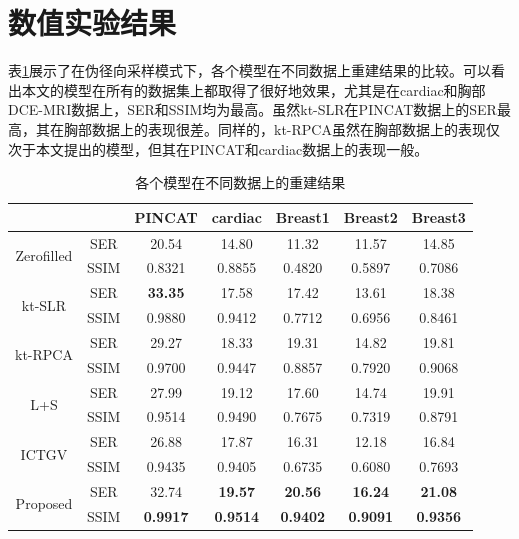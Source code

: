 \section{数值实验结果}
表\ref{tab:result3}展示了在伪径向采样模式下，各个模型在不同数据上重建结果的比较。可以看出本文的模型在所有的数据集上都取得了很好地效果，尤其是在cardiac和胸部DCE-MRI数据上，SER和SSIM均为最高。虽然kt-SLR在PINCAT数据上的SER最高，其在胸部数据上的表现很差。同样的，kt-RPCA虽然在胸部数据上的表现仅次于本文提出的模型，但其在PINCAT和cardiac数据上的表现一般。
\begin{table}
	\centering
	\caption{各个模型在不同数据上的重建结果}
	\begin{tabular}{|c|c|c|c|c|c|c|}
		\hline
		\hline
		\multicolumn{2}{|c|}{\diagbox{模型}{数据集}}& PINCAT & cardiac & Breast1 & Breast2 & Breast3\\	
		\hline
		\multirow{2}{*}{Zerofilled}
		&SER & 20.54 & 14.80 & 11.32 & 11.57 & 14.85\\
		\cline{2-7}&SSIM & 0.8321 & 0.8855 & 0.4820 & 0.5897 & 0.7086\\
		\hline
		\multirow{2}{*}{kt-SLR}
		&SER & \textbf{33.35} & 17.58 & 17.42 & 13.61 & 18.38\\
		\cline{2-7}&SSIM & 0.9880 & 0.9412 & 0.7712 & 0.6956 & 0.8461\\
		\hline
		\multirow{2}{*}{kt-RPCA}
		&SER & 29.27 & 18.33 & 19.31 & 14.82 & 19.81\\
		\cline{2-7}&SSIM & 0.9700 & 0.9447 & 0.8857 & 0.7920 & 0.9068\\
		\hline
		\multirow{2}{*}{L+S}
		&SER & 27.99 & 19.12 & 17.60 & 14.74 & 19.91\\
		\cline{2-7}&SSIM & 0.9514 & 0.9490 & 0.7675 & 0.7319 & 0.8791\\
		\hline
		\multirow{2}{*}{ICTGV}
		&SER & 26.88 & 17.87 & 16.31 & 12.18 & 16.84\\
		\cline{2-7}&SSIM & 0.9435 & 0.9405 & 0.6735 & 0.6080 & 0.7693\\
		\hline
		\multirow{2}{*}{Proposed}
		&SER & 32.74 & \textbf{19.57} & \textbf{20.56} & \textbf{16.24} & \textbf{21.08}\\
		\cline{2-7}&SSIM & \textbf{0.9917} & \textbf{0.9514} & \textbf{0.9402} & \textbf{0.9091} & \textbf{0.9356}\\
		\hline
	\end{tabular}
	\label{tab:result3}
\end{table}

